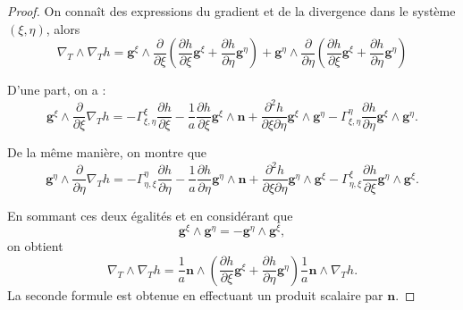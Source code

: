 \begin{proof}
On connaît des expressions du gradient et de la divergence dans le système $(\xi, \eta)$, alors
\begin{equation}
\nabla_T \wedge \nabla_T h = \mathbf{g}^{\xi} \wedge \dfrac{\partial}{\partial \xi} \left( \dfrac{\partial h}{\partial \xi} \mathbf{g}^{\xi} + \dfrac{\partial h}{\partial \eta} \mathbf{g}^{\eta}\right) + \mathbf{g}^{\eta} \wedge \dfrac{\partial}{\partial \eta} \left( \dfrac{\partial h}{\partial \xi} \mathbf{g}^{\xi} + \dfrac{\partial h}{\partial \eta} \mathbf{g}^{\eta}\right)
\end{equation}

D'une part, on a :
\begin{equation}
\mathbf{g}^{\xi} \wedge \dfrac{\partial}{\partial \xi}\nabla_T h = - \Gamma_{\xi,\eta}^{\xi} \dfrac{\partial h}{\partial \xi} - \dfrac{1}{a} \dfrac{\partial h}{\partial \xi} \mathbf{g}^{\xi} \wedge \mathbf{n} + \dfrac{\partial^2 h}{\partial \xi \partial \eta} \mathbf{g}^{\xi} \wedge \mathbf{g}^{\eta} - \Gamma_{\xi, \eta}^{\eta} \dfrac{\partial h}{\partial \eta} \mathbf{g}^{\xi} \wedge \mathbf{g}^{\eta}.
\end{equation}

De la même manière, on montre que 
\begin{equation}
\mathbf{g}^{\eta} \wedge \dfrac{\partial}{\partial \eta}\nabla_T h = - \Gamma_{\eta,\xi}^{\eta} \dfrac{\partial h}{\partial \eta} - \dfrac{1}{a} \dfrac{\partial h}{\partial \eta} \mathbf{g}^{\eta} \wedge \mathbf{n} + \dfrac{\partial^2 h}{\partial \xi \partial \eta} \mathbf{g}^{\eta} \wedge \mathbf{g}^{\xi} - \Gamma_{\eta, \xi}^{\xi} \dfrac{\partial h}{\partial \xi} \mathbf{g}^{\eta} \wedge \mathbf{g}^{\xi}.
\end{equation}

En sommant ces deux égalités et en considérant que \begin{equation}
\mathbf{g}^{\xi} \wedge \mathbf{g}^{\eta} = -\mathbf{g}^{\eta} \wedge \mathbf{g}^{\xi},
\end{equation}
on obtient
\begin{equation}
\nabla_T \wedge \nabla_T h = \dfrac{1}{a} \mathbf{n} \wedge \left( \dfrac{\partial h}{\partial \xi} \mathbf{g}^{\xi} + \dfrac{\partial h}{\partial \eta} \mathbf{g}^{\eta} \right) \dfrac{1}{a} \mathbf{n} \wedge \nabla_T h.
\end{equation}
La seconde formule est obtenue en effectuant un produit scalaire par $\mathbf{n}$.
\end{proof}

